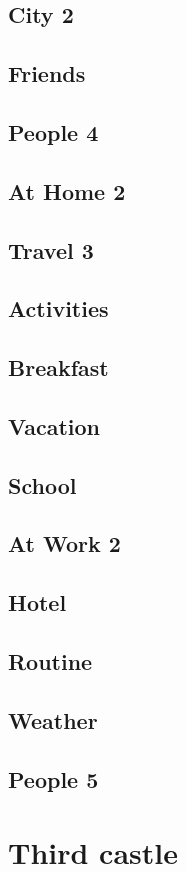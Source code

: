 \documentclass[a4paper,11pt,oneside]{book}
\begin{document}
\section{City 2}
\section{Friends}
\section{People 4}
\section{At Home 2}
\section{Travel 3}
\section{Activities}
\section{Breakfast}
\section{Vacation}
\section{School}
\section{At Work 2}
\section{Hotel}
\section{Routine}
\section{Weather}
\section{People 5}

\chapter{Third castle}
\end{document}
